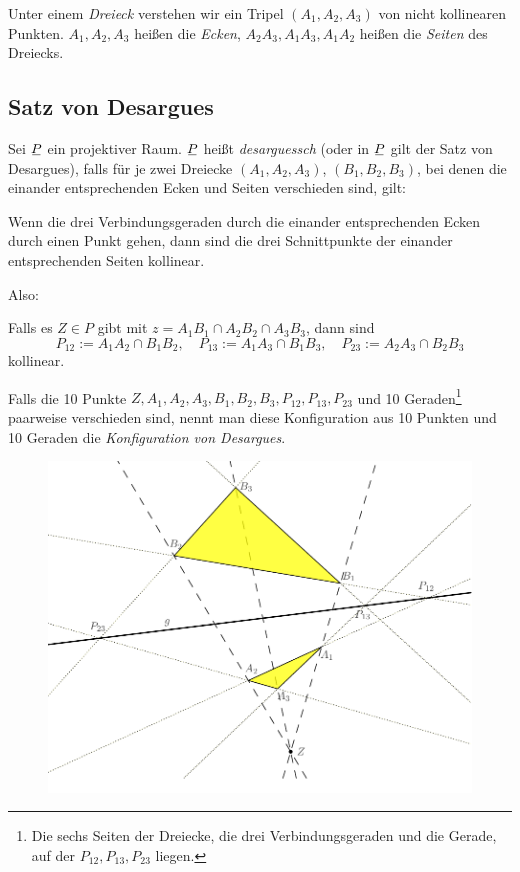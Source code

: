 \begin{defn*}
 Unter einem \emph{Dreieck} verstehen wir ein Tripel $(A_1, A_2, A_3)$ von nicht kollinearen Punkten. $A_1, A_2, A_3$ heißen die \emph{Ecken}, $A_2 A_3, A_1 A_3, A_1 A_2$ heißen die \emph{Seiten} des Dreiecks.
\end{defn*}

\subsection{Satz von Desargues}
\begin{defn*}
 Sei $\proj$ ein projektiver Raum. $\proj$ heißt \emph{desarguessch} (oder in $\proj$ gilt der Satz von Desargues), falls für je zwei Dreiecke $(A_1, A_2, A_3)$, $(B_1, B_2, B_3)$, bei denen die einander entsprechenden Ecken und Seiten verschieden sind, gilt: 
 \begin{addmargin}[.5cm]{0cm}
 Wenn die drei Verbindungsgeraden durch die einander entsprechenden Ecken durch einen Punkt gehen, dann sind die drei Schnittpunkte der einander entsprechenden Seiten kollinear. 
 \end{addmargin}
 Also:
 \begin{addmargin}[.5cm]{0cm}
 Falls es $Z \in P$ gibt mit $z = A_1 B_1 \cap A_2 B_2 \cap A_3 B_3$, dann sind
 \[ P_{12} := A_1 A_2 \cap B_1 B_2, \quad P_{13} := A_1 A_3 \cap B_1 B_3, \quad P_{23} := A_2 A_3 \cap B_2 B_3 \]
 kollinear.
 \end{addmargin}

 Falls die 10 Punkte $Z, A_1, A_2, A_3, B_1, B_2, B_3, P_{12}, P_{13}, P_{23}$ und 10 Geraden\footnote{Die sechs Seiten der Dreiecke, die drei Verbindungsgeraden und die Gerade, auf der $P_{12}, P_{13}, P_{23}$ liegen.}  paarweise verschieden sind, nennt man diese Konfiguration aus 10 Punkten und 10 Geraden die \emph{Konfiguration von Desargues}.
\end{defn*}

\begin{figure}[ht]
 \center
 \includegraphics[width=12cm]{img/desargues}
\end{figure}

